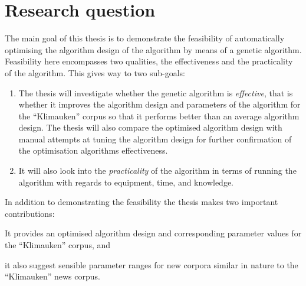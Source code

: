 

\section{Research question}

The main goal of this thesis is to demonstrate the feasibility of automatically optimising the algorithm design of the \CTC algorithm by means of a genetic algorithm.
Feasibility here encompasses two qualities, the effectiveness and the practicality of the algorithm. This gives way to two sub-goals:
\begin{enumerate}
\item The thesis will investigate whether the genetic algorithm is \emph{effective}, that is whether it improves the algorithm design and parameters of the \CTC algorithm for the ``Klimauken'' corpus so that it performs better than an average algorithm design. The thesis will also compare the optimised algorithm design with manual attempts at tuning the algorithm design for further confirmation of the optimisation algorithms effectiveness.
\item It will also look into the \emph{practicality} of the algorithm in terms of running the algorithm with regards to equipment, time, and knowledge.
\end{enumerate}

In addition to demonstrating the feasibility the thesis makes two important contributions:
\begin{inparaenum}[\itshape 1\upshape)]
\item It provides an optimised algorithm design and corresponding parameter values for the ``Klimauken'' corpus, and
\item it also suggest sensible parameter ranges for new corpora similar in nature to the ``Klimauken'' news corpus.
\end{inparaenum}

